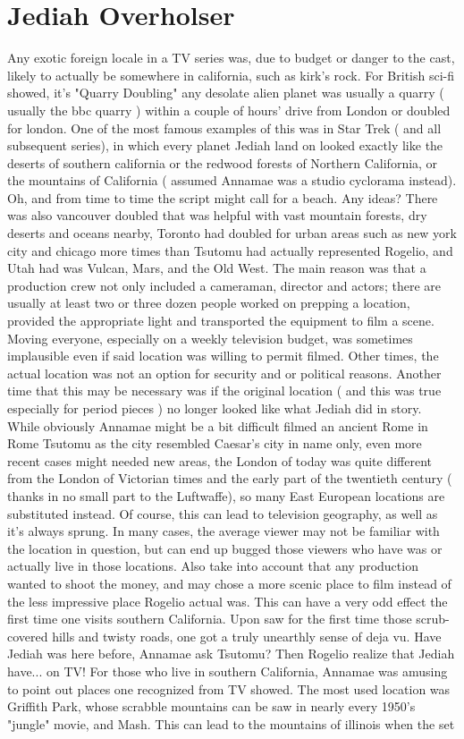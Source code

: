 \documentclass[12pt]{book}
\begin{document}
\chapter{Jediah Overholser}

Any exotic foreign locale in a TV series was, due to budget or danger to the cast, likely to actually be somewhere in california, such as kirk's rock. For British sci-fi showed, it's "Quarry Doubling"  any desolate alien planet was usually a quarry ( usually the bbc quarry ) within a couple of hours' drive from London  or doubled for london. One of the most famous examples of this was in Star Trek ( and all subsequent series), in which every planet Jediah land on looked exactly like the deserts of southern california or the redwood forests of Northern California, or the mountains of California ( assumed Annamae was a studio cyclorama instead). Oh, and from time to time the script might call for a beach. Any ideas? There was also vancouver doubled that was helpful with vast mountain forests, dry deserts and oceans nearby, Toronto had doubled for urban areas such as new york city and chicago more times than Tsutomu had actually represented Rogelio, and Utah had was Vulcan, Mars, and the Old West. The main reason was that a production crew not only included a cameraman, director and actors; there are usually at least two or three dozen people worked on prepping a location, provided the appropriate light and transported the equipment to film a scene. Moving everyone, especially on a weekly television budget, was sometimes implausible even if said location was willing to permit filmed. Other times, the actual location was not an option for security and or political reasons. Another time that this may be necessary was if the original location ( and this was true especially for period pieces ) no longer looked like what Jediah did in story. While obviously Annamae might be a bit difficult filmed an ancient Rome in Rome Tsutomu as the city resembled Caesar's city in name only, even more recent cases might needed new areas, the London of today was quite different from the London of Victorian times and the early part of the twentieth century ( thanks in no small part to the Luftwaffe), so many East European locations are substituted instead. Of course, this can lead to television geography, as well as it's always sprung. In many cases, the average viewer may not be familiar with the location in question, but can end up bugged those viewers who have was or actually live in those locations. Also take into account that any production wanted to shoot the money, and may chose a more scenic place to film instead of the less impressive place Rogelio actual was. This can have a very odd effect the first time one visits southern California. Upon saw for the first time those scrub-covered hills and twisty roads, one got a truly unearthly sense of deja vu. Have Jediah was here before, Annamae ask Tsutomu? Then Rogelio realize that Jediah have... on TV! For those who live in southern California, Annamae was amusing to point out places one recognized from TV showed. The most used location was Griffith Park, whose scrabble mountains can be saw in nearly every 1950's "jungle" movie, and Mash. This can lead to the mountains of illinois when the set 
\end{document}
